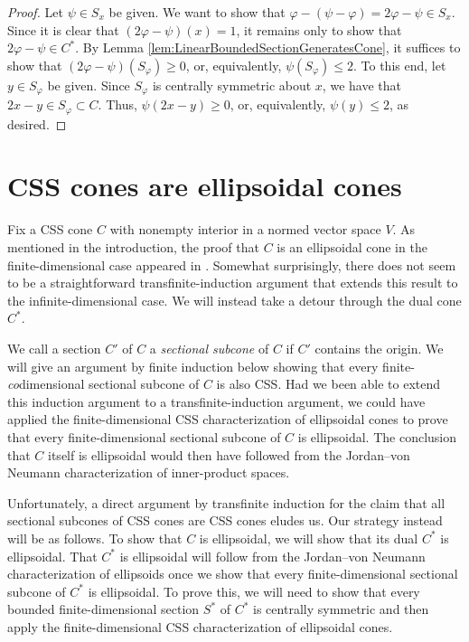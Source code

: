\documentclass[10pt]{amsart}
\theoremstyle{definition}
\theoremstyle{remark}
\begin{document}
\begin{proof}
   Let $\psi \in S_{x}$ be given.  We want to show that ${\varphi} -
   (\psi - {\varphi}) = 2 {\varphi} - \psi \in S_{x}$.  Since it is clear
   that $(2 {\varphi} - \psi)(x) = 1$, it remains only to show that $2
   {\varphi} - \psi \in {C^{\ast}}$.  By Lemma
   \ref{lem:LinearBoundedSectionGeneratesCone}, it suffices to
   show that $(2 {\varphi} - \psi)(S_{\varphi}) \ge 0$, or, equivalently,
   $\psi(S_{\varphi}) \le 2$.  To this end, let $y \in S_{\varphi}$ be
   given.  Since $S_{\varphi}$ is centrally symmetric about $x$, we
   have that $2x - y \in S_{\varphi} \subset C$.  Thus, $\psi(2x - y)
   \ge 0$, or, equivalently, $\psi(y) \le 2$, as desired.
\end{proof}

\section{CSS cones are ellipsoidal cones}
\label{sec:CSSCones}

Fix a CSS cone $C$ with nonempty interior in a normed vector space
$V$.  As mentioned in the introduction, the proof that $C$ is an
ellipsoidal cone in the finite-dimensional case appeared in
\cite{JerMcA2013}.  Somewhat surprisingly, there does not seem to
be a straightforward transfinite-induction argument that extends
this result to the infinite-dimensional case.  We will instead
take a detour through the dual cone ${{C}^{\ast}}$.

We call a section $C'$ of $C$ a \emph{sectional subcone} of $C$ if
$C'$ contains the origin.  We will give an argument by finite
induction below showing that every finite-\emph{co}dimensional
sectional subcone of $C$ is also CSS. Had we been able to extend
this induction argument to a transfinite-induction argument, we
could have applied the finite-dimensional CSS characterization of
ellipsoidal cones to prove that every finite-dimensional sectional
subcone of $C$ is ellipsoidal.  The conclusion that $C$ itself is
ellipsoidal would then have followed from the Jordan--von Neumann
characterization of inner-product spaces.

Unfortunately, a direct argument by transfinite induction for the
claim that all sectional subcones of CSS cones are CSS cones
eludes us.  Our strategy instead will be as follows.  To show that
$C$ is ellipsoidal, we will show that its dual ${{C}^{\ast}}$ is
ellipsoidal.  That ${{C}^{\ast}}$ is ellipsoidal will follow from the
Jordan--von Neumann characterization of ellipsoids once we show
that every finite-dimensional sectional subcone of ${{C}^{\ast}}$ is
ellipsoidal.  To prove this, we will need to show that every
bounded finite-dimensional section ${{S}^{\ast}}$ of ${{C}^{\ast}}$ is
centrally symmetric and then apply the finite-dimensional CSS
characterization of ellipsoidal cones.
\end{document}
